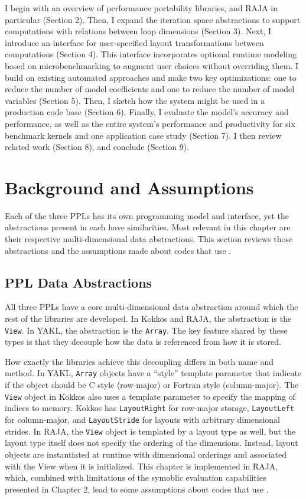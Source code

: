 I begin with an overview of performance portability libraries, and RAJA in particular (Section 2).
Then, I expand the iteration space abstractions to support computations with relations between loop dimensions (Section 3).
Next, I introduce an interface for user-specified layout transformations between computations (Section 4).
This interface incorporates optional runtime modeling based on microbenchmarking to augment user choices without overriding them.
I build on existing automated approaches and make two key optimizations: one to reduce the number of model coefficients and one to reduce the number of model variables (Section 5).
Then, I sketch how the \FormatDecisions{} system might be used in a production code base (Scetion 6).
Finally, I evaluate the model's accuracy and performance, as well as the entire system's performance and productivity for six benchmark kernels and one application case study (Section 7).
I then review related work (Section 8), and conclude (Section 9).


\section{Background and Assumptions}

Each of the three PPLs has its own programming model and interface, yet the abstractions present in each have similarities.
Most relevant in this chapter are their respective multi-dimensional data abstractions.
This section reviews those abstractions and the assumptions made about codes that use \FormatDecisions{}.

\subsection{PPL Data Abstractions}

All three PPLs have a core multi-dimensional data abstraction around which the rest of the libraries are developed.
In Kokkos and RAJA, the abstraction is the \verb.View..
In YAKL, the abstraction is the \verb.Array..
The key feature shared by these types is that they decouple how the data is referenced from how it is stored.

How exactly the libraries achieve this decoupling differs in both name and method.
In YAKL, \verb.Array. objects have a ``style'' template parameter that indicate if the object should be C style (row-major) or Fortran style (column-major). 
The \verb.View. object in Kokkos also uses a template parameter to specify the mapping of indices to memory.
Kokkos has \verb.LayoutRight. for row-major storage, \verb.LayoutLeft. for column-major, and \verb.LayoutStride. for layouts with arbitrary dimensional strides.
In RAJA, the \verb.View. object is templated by a layout type as well, but the layout type itself does not specify the ordering of the dimensions. 
Instead, layout objects are instantiated at runtime with dimensional orderings and associated with the View when it is initialized.
This chapter is implemented in RAJA, which, combined with limitations of the symoblic evaluation capabilities presented in Chapter 2, lead to some assumptions about codes that use \FormatDecisions{}.


